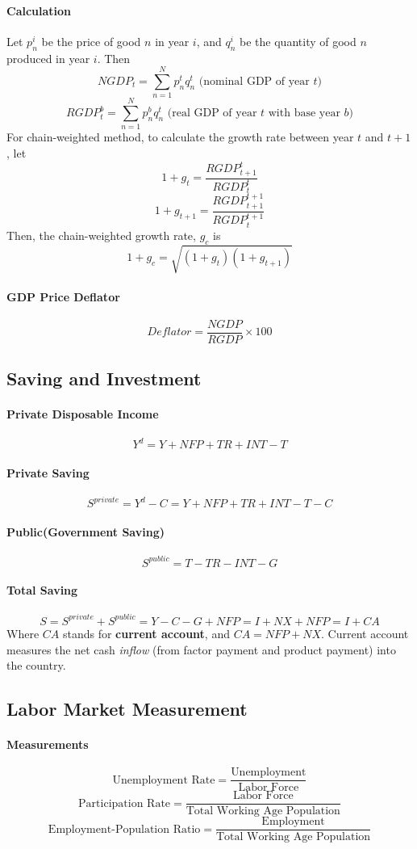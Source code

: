 \documentclass[11pt]{article}
\begin{document}
\paragraph{Calculation} Let $p_n^i$ be the price of good $n$ in year $i$, and $q_n^i$ be the quantity of good $n$ produced in year $i$. Then
\[
	NGDP_t = \sum_{n=1}^N p_n^t q_n^t \text{ (nominal GDP of year $t$)}
\]
\[
	RGDP_t^b = \sum_{n=1}^N p_n^b q_n^t \text{ (real GDP of year $t$ with base year $b$)}
\]
For chain-weighted method, to calculate the growth rate between year $t$ and $t + 1$, let
\[
	1 + g_t = \frac{RGDP_{t+1}^t}{RGDP_{t}^t}
\]
\[
	1 + g_{t+1} = \frac{RGDP_{t+1}^{t+1}}{RGDP_{t}^{t+1}}
\]
Then, the chain-weighted growth rate, $g_c$ is 
\[
	1 + g_c = \sqrt{(1+g_t)(1+g_{t+1})}
\]
\paragraph{GDP Price Deflator}
\[
	Deflator = \frac{NGDP}{RGDP} \times 100
\]

\subsection{Saving and Investment}
\paragraph{Private Disposable Income}
\[
	Y^d = Y + NFP + TR + INT - T
\]
\paragraph{Private Saving}
\[
	S^{private} = Y^d - C = Y + NFP + TR + INT - T - C
\]
\paragraph{Public(Government Saving)}
\[
	S^{public} = T - TR - INT - G
\]
\paragraph{Total Saving}
\[
	S = S^{private} + S^{public} = Y - C - G + NFP = I + NX + NFP = I + CA
\]
Where $CA$ stands for \textbf{current account}, and $CA = NFP + NX$. Current account measures the net cash \emph{inflow} (from factor payment and product payment) into the country.
\subsection{Labor Market Measurement}
\paragraph{Measurements}
\[
	\text{Unemployment Rate} = \frac{\text{Unemployment}}{\text{Labor Force}}
\]
\[
	\text{Participation Rate} = \frac{\text{Labor Force}}{\text{Total Working Age Population}}
\]
\[
	\text{Employment-Population Ratio} = \frac{\text{Employment}}{\text{Total Working Age Population}}
\]
\end{document}
